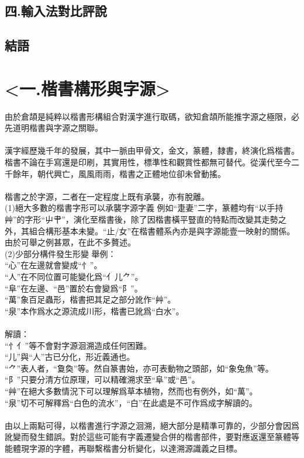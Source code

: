 \documentclass{article}
\begin{document}
\subsection{四.輸入法對比評說}
\subsection{結語}



\section{<一.楷書構形與字源>}

由於倉頡是純粹以楷書形構組合對漢字進行取碼，欲知倉頡所能推字源之極限，必先道明楷書與字源之關聯。\\
\\
漢字經歷幾千年的發展，其中一脈由甲骨文，金文，篆體，隸書，終演化爲楷書。楷書不論在手寫還是印刷，其實用性，標準性和觀賞性都無可替代。從漢代至今二千餘年，朝代興亡，風風雨雨，楷書之正體地位卻未曾動搖。\\
\\
楷書之於字源，二者在一定程度上既有承襲，亦有脫離。\\

(1)絕大多數的楷書字形可以承襲字源字義
例如“疌妻”二字，篆體均有“以手持艸”的字形“屮肀”，演化至楷書後，除了因楷書橫平豎直的特點而改變其走勢之外，其組合構形基本未變。“止/女”在楷書體系內亦是與字源能壹一映射的關係。\\
由於可舉之例甚眾，在此不多贅述。\\

(2)少部分構件發生形變
舉例：\\
“心”在左邊就會變成“忄”。\\
“人”在不同位置可能變化爲“亻儿⺈”。\\
“阜”在左邊、“邑”置於右會變爲“阝”。\\
“萬”象百足蟲形，楷書把其足之部分訛作“艸”。\\
“泉”本作爲水之源流成川形，楷書已訛爲“白水”。\\
\\
解讀：\\
“忄亻”等不會對字源洄溯造成任何困難。\\
“儿”與“人”古已分化，形近義通也。\\
“⺈”表人者，“敻奐”等。然自篆書始，亦可表動物之頭部，如“象兔魚”等。\\
“阝”只要分清方位原理，可以精確溯求至“阜”或“邑”。\\
“艸”在絕大多數情況下可以理解爲草本植物，然而也有例外，如“萬”。\\
“泉”切不可解釋爲“白色的流水”，“白”在此處是不可作爲成字解讀的。\\
\\
由以上兩點可得，以楷書進行字源之洄溯，絕大部分是精準可靠的，少部分會因爲訛變而發生錯誤。對於這些可能有字義遷變合併的楷書部件，要對應返還至篆體等能體現字源的字體，再聯繫楷書分析變化，以達溯源識義之目標。\\
\\
\end{document}
